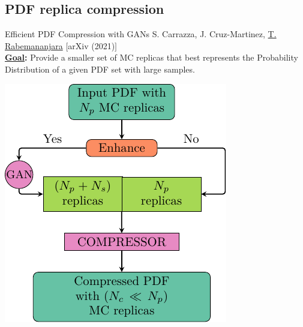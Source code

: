 \providecommand{\iRef}[1]{{\tiny\color{HallowGreen} $[$#1$]$}}

\author[Tanjona Rabemananjara]{}

\subsection{PDF replica compression}

\begin{frame}{Efficient PDF Compression with GANs}
	S. Carrazza, J. Cruz-Martinez, \underline{T. Rabemananjara} \iRef{arXiv (2021)} \\
	\textbf{\textcolor{HallowGreen}{\underline{Goal}:}} Provide a smaller set of MC 
	replicas that best represents the Probability Distribution of a given PDF set 
	with large samples.
	\vspace*{-0.1cm}	
	\begin{center}
	\includegraphics[height=.7\textheight]{./gan_compressor/imgs/pygans.pdf}
	\end{center}
\end{frame}

